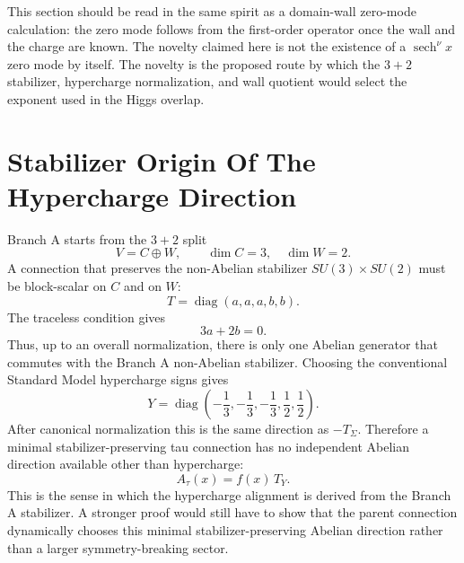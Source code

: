 \documentclass[11pt]{article}
\begin{document}
This section should be read in the same spirit as a domain-wall zero-mode
calculation: the zero mode follows from the first-order operator once the wall
and the charge are known.  The novelty claimed here is not the existence of a
$\operatorname{sech}^\nu x$ zero mode by itself.  The novelty is the proposed
route by which the $3+2$ stabilizer, hypercharge normalization, and wall
quotient would select the exponent used in the Higgs overlap.

\section{Stabilizer Origin Of The Hypercharge Direction}
Branch A starts from the $3+2$ split
\begin{equation}
V=C\oplus W,\qquad \dim C=3,\quad \dim W=2 .
\end{equation}
A connection that preserves the non-Abelian stabilizer $SU(3)\times SU(2)$
must be block-scalar on $C$ and on $W$:
\begin{equation}
T=\operatorname{diag}(a,a,a,b,b).
\end{equation}
The traceless condition gives
\begin{equation}
3a+2b=0 .
\end{equation}
Thus, up to an overall normalization, there is only one Abelian generator that
commutes with the Branch A non-Abelian stabilizer. Choosing the conventional
Standard Model hypercharge signs gives
\begin{equation}
Y=\operatorname{diag}\left(-\frac13,-\frac13,-\frac13,\frac12,\frac12\right).
\end{equation}
After canonical normalization this is the same direction as $-T_\Sigma$.
Therefore a minimal stabilizer-preserving tau connection has no independent
Abelian direction available other than hypercharge:
\begin{equation}
A_\tau(x)=f(x)\,T_Y .
\end{equation}
This is the sense in which the hypercharge alignment is derived from the Branch
A stabilizer. A stronger proof would still have to show that the parent
connection dynamically chooses this minimal stabilizer-preserving Abelian
direction rather than a larger symmetry-breaking sector.
\end{document}
